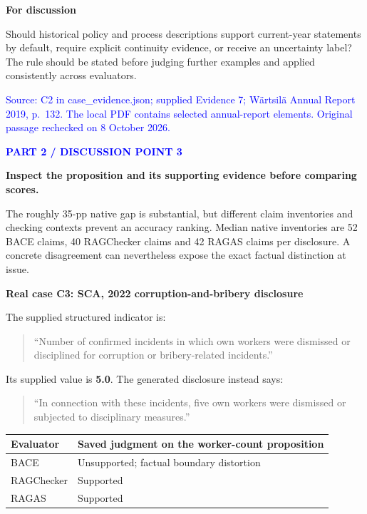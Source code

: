 \documentclass[11pt,a4paper]{article}
\newcommand{\pagetitle}[2]{\textcolor{blue}{\small\bfseries #1}\par\vspace{2pt}{\LARGE\bfseries #2\par}\vspace{5pt}}
\newcommand{\lead}[1]{{\large\bfseries #1}\par}
\newcommand{\subhead}[1]{\vspace{5pt}\textbf{#1}\par}
\newcommand{\source}[1]{{\footnotesize\textcolor{blue}{Source: #1}\par}}
\newcommand{\question}[1]{\par\vspace{5pt}\noindent\colorbox{cream}{\parbox{\dimexpr\linewidth-2\fboxsep\relax}{\vspace{4pt}\textcolor{amber}{\textbf{For discussion}}\par #1\vspace{4pt}}}\par}
\newcommand{\quoted}[1]{\begin{quote}\small ``#1''\end{quote}}
\begin{document}
\question{Should historical policy and process descriptions support current-year statements by default, require explicit continuity evidence, or receive an uncertainty label? The rule should be stated before judging further examples and applied consistently across evaluators.}
\source{C2 in case\_evidence.json; supplied Evidence 7; W\"artsil\"a Annual Report 2019, p.~132. The local PDF contains selected annual-report elements. Original passage rechecked on 8 October 2026.}

\newpage
\pagetitle{PART 2 / DISCUSSION POINT 3}{How should evaluator disagreement be read?}
\lead{Inspect the proposition and its supporting evidence before comparing scores.}

The roughly 35-pp native gap is substantial, but different claim inventories and checking contexts prevent an accuracy ranking. Median native inventories are 52 BACE claims, 40 RAGChecker claims and 42 RAGAS claims per disclosure. A concrete disagreement can nevertheless expose the exact factual distinction at issue.

\subhead{Real case C3: SCA, 2022 corruption-and-bribery disclosure}
The supplied structured indicator is:
\quoted{Number of confirmed incidents in which own workers were dismissed or disciplined for corruption or bribery-related incidents.}
Its supplied value is \textbf{5.0}. The generated disclosure instead says:
\quoted{In connection with these incidents, five own workers were dismissed or subjected to disciplinary measures.}

\begin{center}
\end{center}

\begin{center}
\begin{tabularx}{0.93\linewidth}{lX}
\toprule
Evaluator & Saved judgment on the worker-count proposition\\
\midrule
BACE & Unsupported; factual boundary distortion\\
RAGChecker & Supported\\
RAGAS & Supported\\
\bottomrule
\end{tabularx}
\end{center}
\end{document}
